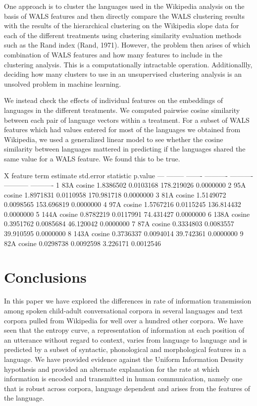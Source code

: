 \documentclass[10pt, letterpaper]{article}
\newenvironment{CodeChunk}{}{}
\begin{document}
One approach is to cluster the languages used in the Wikipedia analysis
on the basis of WALS features and then directly compare the WALS
clustering results with the results of the hierarchical clustering on
the Wikipedia slope data for each of the different treatments using
clustering similarity evaluation methods such as the Rand index (Rand,
1971). However, the problem then arises of which combination of WALS
features and how many features to include in the clustering analysis.
This is a computationally intractable operation. Additionallly, deciding
how many clusters to use in an unsupervised clustering analysis is an
unsolved problem in machine learning.

We instead check the effects of individual features on the embeddings of
languages in the different treatments. We computed pairwise cosine
similarity between each pair of language vectors within a treatment. For
a subset of WALS features which had values entered for most of the
languages we obtained from Wikipedia, we used a generalized linear model
to see whether the cosine similarity between languages mattered in
predicting if the languages shared the same value for a WALS feature. We
found this to be true.

\begin{CodeChunk}


  X  feature   term       estimate   std.error    statistic     p.value
---  --------  -------  ----------  ----------  -----------  ----------
  1  83A       cosine    1.8386502   0.0103168   178.219026   0.0000000
  2  95A       cosine    1.8971831   0.0110958   170.981718   0.0000000
  3  81A       cosine    1.5149072   0.0098565   153.696819   0.0000000
  4  97A       cosine    1.5767216   0.0115245   136.814432   0.0000000
  5  144A      cosine    0.8782219   0.0117991    74.431427   0.0000000
  6  138A      cosine    0.3951762   0.0085684    46.120042   0.0000000
  7  87A       cosine    0.3334803   0.0083557    39.910595   0.0000000
  8  143A      cosine    0.3736337   0.0094014    39.742361   0.0000000
  9  82A       cosine    0.0298738   0.0092598     3.226171   0.0012546

\end{CodeChunk}

\section{Conclusions}\label{conclusions}

In this paper we have explored the differences in rate of information
transmission among spoken child-adult conversational corpora in several
languages and text corpora pulled from Wikipedia for well over a hundred
other corpora. We have seen that the entropy curve, a representation of
information at each position of an utterance without regard to context,
varies from language to language and is predicted by a subset of
syntactic, phonological and morphological features in a language. We
have provided evidence against the Uniform Information Density
hypothesis and provided an alternate explanation for the rate at which
information is encoded and transmitted in human communication, namely
one that is robust across corpora, language dependent and arises from
the features of the language.
\end{document}
